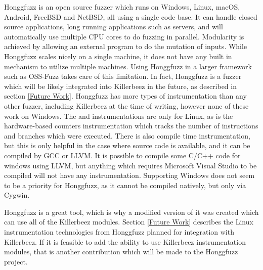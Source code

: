 Honggfuzz\cite{honggfuzz} is an open source fuzzer which runs on Windows, Linux,
macOS, Android, FreeBSD and NetBSD, all using a single code base. It can handle
closed source applications, long running applications such as servers, and will
automatically use multiple CPU cores to do fuzzing in parallel. Modularity is
achieved by allowing an external program to do the mutation of inputs. While
Honggfuzz scales nicely on a single machine, it does not have any built in
mechanism to utilize multiple machines.  Using Honggfuzz in a larger framework
such as OSS-Fuzz takes care of this limitation.  In fact, Honggfuzz is a fuzzer
which will be likely integrated into Killerbeez in the future, as described in
section \ref{Future Work}. Honggfuzz has more types of instrumentation than any
other fuzzer, including Killerbeez at the time of writing, however none of
these work on Windows. The \BTS{} and \IPT{} instrumentations are only for
Linux, as is the hardware-based counters instrumentation which tracks the
number of instructions and branches which were executed. There is also compile time
instrumentation, but this is only helpful in the case where source code is
available, and it can be compiled by GCC or LLVM.  It is possible to compile
some C/C++ code for windows using LLVM, but anything which requires Microsoft
Visual Studio to be compiled will not have any instrumentation.  Supporting
Windows does not seem to be a priority for Honggfuzz, as it cannot be compiled
natively, but only via Cygwin.

Honggfuzz is a great tool, which is why a modified version of it was created
which can use all of the Killerbeez modules.\cite{honggfuzzgrimm} Section
\ref{Future Work} describes the Linux instrumentation technologies from
Honggfuzz planned for integration with Killerbeez.
If it is feasible to add the ability to use
Killerbeez instrumentation modules, that is another contribution which will be
made to the Honggfuzz project.
